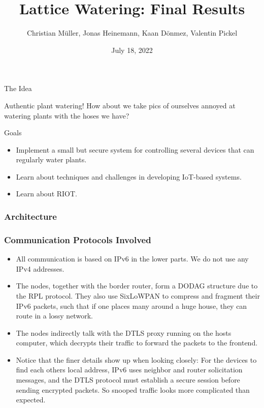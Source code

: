 \documentclass[10pt, xcolor=svgnames]{beamer}
\title{Lattice Watering: Final Results}
\author{Christian Müller, Jonas Heinemann, Kaan Dönmez, Valentin Pickel}
\institute{
    Software Project on Internet Communication

    Summer Term 2022
    
    Freie Universität Berlin

    Institute for Computer Science
}
\date{July 18, 2022}
\begin{document}
\maketitle

\begin{frame}{The Idea}

    Authentic plant watering! How about we take pics of ourselves annoyed at watering plants with the hoses we have?

\end{frame}

\begin{frame}{Goals}

    \begin{itemize}
        \item Implement a small but secure system for controlling several devices that can regularly water plants.
        \item Learn about techniques and challenges in developing IoT-based systems.
        \item Learn about RIOT.
    \end{itemize}
\end{frame}

\begin{frame}
    \frametitle{Architecture}

    

\end{frame}

\begin{frame}
    \frametitle{Communication Protocols Involved}

    \begin{itemize}
        \item All communication is based on IPv6 in the lower parts. We do not use any IPv4 addresses.
        \item The nodes, together with the border router, form a DODAG structure due to the RPL protocol. They also use SixLoWPAN to compress and fragment their IPv6 packets, such that if one places many around a huge house, they can route in a lossy network.
        \item The nodes indirectly talk with the DTLS proxy running on the hosts computer, which decrypts their traffic to forward the packets to the frontend.
        \item Notice that the finer details show up when looking closely: For the devices to find each others local address, IPv6 uses neighbor and router solicitation messages, and the DTLS protocol must establish a secure session before sending encrypted packets. So snooped traffic looks more complicated than expected.
    \end{itemize}

\end{frame}
\end{document}
